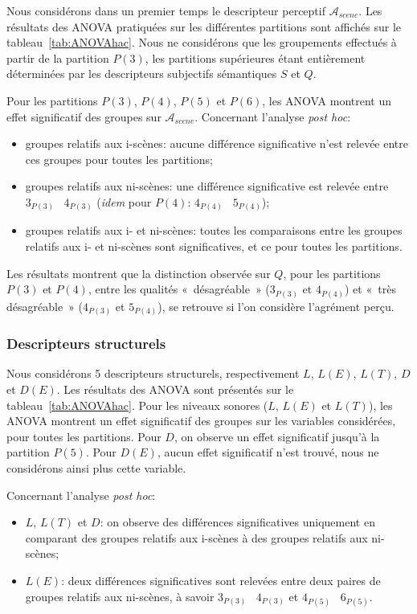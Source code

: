 Nous considérons dans un premier temps le descripteur perceptif $\mathcal{A}_{scene}$. Les résultats des ANOVA pratiquées sur les différentes partitions sont affichés sur le tableau~\ref{tab:ANOVAhac}. Nous ne considérons que les groupements effectués à partir de la partition $P(3)$, les partitions supérieures étant entièrement déterminées par les descripteurs subjectifs sémantiques $S$ et $Q$. 

Pour les partitions $P(3)$, $P(4)$, $P(5)$ et $P(6)$, les ANOVA montrent un effet significatif des groupes sur $\mathcal{A}_{scene}$. Concernant l'analyse \emph{post hoc}:

\begin{itemize}
\item groupes relatifs aux i-scènes: aucune différence significative n'est relevée entre ces groupes pour toutes les partitions;
\item groupes relatifs aux ni-scènes: une différence significative est relevée entre $3_{P(3)}$ \vs~$4_{P(3)}$ (\emph{idem} pour $P(4)$: $4_{P(4)}$ \vs~$5_{P(4)}$); 
\item groupes relatifs aux i- et ni-scènes: toutes les comparaisons entre les groupes relatifs aux i- et ni-scènes sont significatives, et ce pour toutes les partitions. 
\end{itemize}

Les résultats montrent que la distinction observée sur $Q$, pour les partitions $P(3)$ et $P(4)$, entre les qualités «~désagréable~» ($3_{P(3)}$ et $4_{P(4)}$) et «~très désagréable~» ($4_{P(3)}$ et $5_{P(4)}$), se retrouve si l'on considère l'agrément perçu. \\

\subsubsection{Descripteurs structurels}

Nous considérons 5 descripteurs structurels, respectivement $L$, $L(E)$, $L(T)$, $D$ et $D(E)$. Les résultats des ANOVA sont présentés sur le tableau~\ref{tab:ANOVAhac}. Pour les niveaux sonores ($L$, $L(E)$ et $L(T)$), les ANOVA montrent un effet significatif des groupes sur les variables considérées, pour toutes les partitions. Pour $D$, on observe un effet significatif jusqu’à la partition $P(5)$. Pour $D(E)$, aucun effet significatif n'est trouvé, nous ne considérons ainsi plus cette variable.

Concernant l'analyse \emph{post hoc}:

\begin{itemize}
\item $L$, $L(T)$ et $D$: on observe des différences significatives uniquement en comparant des groupes relatifs aux i-scènes à des groupes relatifs aux ni-scènes;
\item $L(E)$: deux différences significatives sont relevées entre deux paires de groupes relatifs aux ni-scènes, à savoir $3_{P(3)}$ \vs~$4_{P(3)}$ et $4_{P(5)}$ \vs~$6_{P(5)}$.
\end{itemize}

